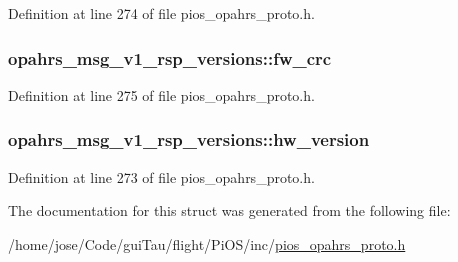 Definition at line 274 of file pios\-\_\-opahrs\-\_\-proto.\-h.

\hypertarget{structopahrs__msg__v1__rsp__versions_a6a004ed79625b3af8be61a1ae8f3c91d}{
\subsubsection[{fw\-\_\-crc}]{ opahrs\-\_\-msg\-\_\-v1\-\_\-rsp\-\_\-versions\-::fw\-\_\-crc}}\label{structopahrs__msg__v1__rsp__versions_a6a004ed79625b3af8be61a1ae8f3c91d}


Definition at line 275 of file pios\-\_\-opahrs\-\_\-proto.\-h.

\hypertarget{structopahrs__msg__v1__rsp__versions_a002384f85150d4ee542dd0dcc80cc4f4}{
\subsubsection[{hw\-\_\-version}]{ opahrs\-\_\-msg\-\_\-v1\-\_\-rsp\-\_\-versions\-::hw\-\_\-version}}\label{structopahrs__msg__v1__rsp__versions_a002384f85150d4ee542dd0dcc80cc4f4}


Definition at line 273 of file pios\-\_\-opahrs\-\_\-proto.\-h.



The documentation for this struct was generated from the following file\-:\begin{DoxyCompactItemize}
\item 
/home/jose/\-Code/gui\-Tau/flight/\-Pi\-O\-S/inc/\hyperlink{pios__opahrs__proto_8h}{pios\-\_\-opahrs\-\_\-proto.\-h}\end{DoxyCompactItemize}
